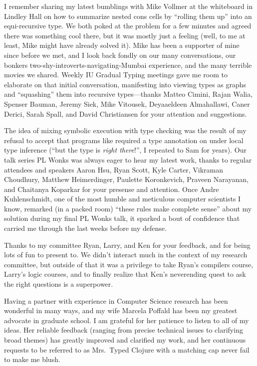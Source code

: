 I remember sharing my latest bumblings with Mike Vollmer at the whiteboard in Lindley Hall
on how to summarize nested cons cells by ``rolling them up'' into an equi-recursive type.
We both poked at the problem for a few minutes and agreed there was something cool there,
but it was mostly just a feeling (well, to me at least, Mike might have already solved it).
Mike has been a supporter of mine since before we met, and I look back fondly on our
many conversations, our bonkers two-shy-introverts-navigating-Mumbai experience,
and the many terrible movies we shared.
Weekly IU Gradual Typing meetings
gave me room to elaborate on that initial conversation, manifesting into
viewing types as graphs and ``squashing'' them into recursive types---thanks
Matteo Cimini, Rajan Walia, Spenser Bauman, Jeremy Siek, Mike Vitousek, Deyaaeldeen Almahallawi,
Caner Derici, Sarah Spall, and David Christiansen
for your attention and suggestions.

The idea of mixing symbolic execution with type checking was the result of my refusal
to accept that programs like  required a type annotation
on  under local type inference
(``but the type is \emph{right there}!'', I repeated to Sam for years).
Our talk series PL Wonks was always eager to hear my latest work,
thanks to regular attendees and speakers Aaron Hsu, Ryan Scott, Kyle Carter, 
Vikraman Choudhury, Matthew Heimerdinger, Paulette Koronkevich, Praveen Narayanan,
and
Chaitanya Koparkar for your presense and attention.
Once Andre Kuhlenschmidt, one of the most humble and meticulous computer scientists
I know, remarked (in a packed room) ``these rules make complete sense'' 
about my solution during my final PL Wonks talk,
it sparked a bout of confidence that carried
me through the last weeks before my defense.

Thanks to my committee Ryan, Larry, and Ken for your feedback, and for being
lots of fun to present to.
We didn't interact much in the context of my research committee, but outside of that
it was a privilege to take Ryan's compilers course, Larry's logic courses,
and to finally realize that Ken's neverending quest to ask the right questions
is a superpower.

Having a partner with experience in Computer Science research has been wonderful
in many ways, and my wife Marcela Poffald has been my greatest advocate in graduate school.
I am grateful for her patience to listen to all of my ideas.
Her reliable feedback (ranging from precise technical issues to clarifying broad themes)
has greatly improved and clarified my work,
and her continuous requests
to be referred to as Mrs.~Typed Clojure with a matching cap never
fail to make me blush.
